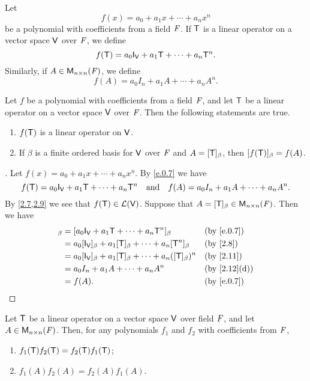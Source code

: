 \begin{defn}\label{e.0.7}
	Let
	\[
		f(x) = a_0 + a_1 x + \cdots + a_n x^n
	\]
	be a polynomial with coefficients from a field \(\mathit{F}\).
	If \(\mathsf{T}\) is a linear operator on a vector space \(\mathsf{V}\) over \(\mathit{F}\), we define
	\[
		f(\T) = a_0 \IT[\V] + a_1 \T + \cdots + a_n \T^n.
	\]
	Similarly, if \(A \in \ms[n][n][\F]\), we define
	\[
		f(A) = a_0 I_n + a_1 A + \cdots + a_n A^n.
	\]
\end{defn}

\begin{thm}\label{e.3}
	Let \(f\) be a polynomial with coefficients from a field \(\mathit{F}\), and let \(\mathsf{T}\) be a linear operator on a vector space \(\mathsf{V}\) over \(\mathit{F}\).
	Then the following statements are true.
	\begin{enumerate}
		\item \(f(\mathsf{T})\) is a linear operator on \(\mathsf{V}\).
		\item If \(\beta\) is a finite ordered basis for \(\mathsf{V}\) over \(\mathit{F}\) and \(A = [\mathsf{T}]_{\beta}\), then \([f(\mathsf{T})]_{\beta} = f(A)\).
	\end{enumerate}
\end{thm}

\begin{proof}[]
	Let \(f(x) = a_0 + a_1 x + \cdots + a_n x^n\).
	By \cref{e.0.7} we have
	\[
		f(\T) = a_0 \IT[\V] + a_1 \T + \cdots + a_n \T^n \quad \text{and} \quad f(A) = a_0 I_n + a_1 A + \cdots + a_n A^n.
	\]
	By \cref{2.7,2.9} we see that \(f(\mathsf{T}) \in \mathcal{L}(\mathsf{V})\).
	Suppose that \(A = [\T]_{\beta} \in \ms[n][n][\F]\).
	Then we have
	\begin{align*}
		[f(\T)]_{\beta} & = [a_0 \IT[\V] + a_1 \T + \cdots + a_n \T^n]_{\beta}                       &  & \by{e.0.7}   \\
		                & = a_0 [\IT[\V]]_{\beta} + a_1 [\T]_{\beta} + \cdots + a_n [\T^n]_{\beta}   &  & \by{2.8}     \\
		                & = a_0 [\IT[\V]]_{\beta} + a_1 [\T]_{\beta} + \cdots + a_n ([\T]_{\beta})^n &  & \by{2.11}    \\
		                & = a_0 I_n + a_1 A + \cdots + a_n A^n                                       &  & \by{2.12}[d] \\
		                & = f(A).                                                                    &  & \by{e.0.7}
	\end{align*}
\end{proof}

\begin{thm}\label{e.4}
	Let \(\mathsf{T}\) be a linear operator on a vector space \(\mathsf{V}\) over field \(\mathit{F}\), and let \(A \in \ms[n][n][\F]\).
	Then, for any polynomials \(f_1\) and \(f_2\) with coefficients from \(\mathit{F}\),
	\begin{enumerate}
		\item \(f_1(\mathsf{T}) f_2(\mathsf{T}) = f_2(\mathsf{T}) f_1(\mathsf{T})\);
		\item \(f_1(A) f_2(A) = f_2(A) f_1(A)\).
	\end{enumerate}
\end{thm}


